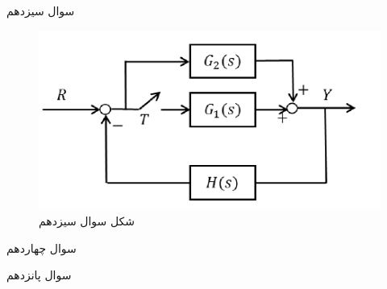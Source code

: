 \documentclass{article}
\begin{document}
\begin{problem}{سوال سیزدهم}
	
	
	
	
	
\end{problem}
\begin{figure}
	\includegraphics[width=\linewidth]{Second Series/7.png}
	\caption{شکل سوال سیزدهم}
\end{figure}

\begin{problem}{سوال چهاردهم}
	
	
	
	
	
\end{problem}


\begin{problem}{سوال پانزدهم}
	
	
	
	
	
\end{problem}
\end{document}
